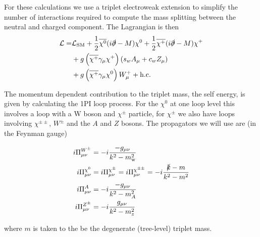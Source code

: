 \documentclass[11pt]{article}
\newcommand{\mychi}{\raisebox{0pt}[1ex][1ex]{$\chi$}}
\begin{document}
For these calculations we use a triplet electroweak extension to simplify the number of interactions required to compute the mass splitting between the neutral and charged component.  The Lagrangian is then
\begin{align}
\begin{split}
\mathcal{L}=&\mathcal{L}_{\text{SM}}+\frac{1}{2}\overline{\mychi^0}(i\slashed{\partial}-M)\mychi^0+\frac{1}{2}\overline{\mychi^+}(i\slashed{\partial}-M)\mychi^{+}\\
&+g\left(\overline{\mychi^+}\gamma_{\mu}\mychi^+\right)\left(s_wA_{\mu}+c_wZ_{\mu}\right)\\
&+g\left(\overline{\mychi^+}\gamma_{\mu}\mychi^0 \right)W_{\mu}^++\text{h.c.}
\end{split}
\end{align}

The momentum dependent contribution to the triplet mass, the self energy, is given by calculating the 1PI loop process.  For the $
\chi^0$ at one loop level this involves a loop with a W boson and $\chi^{\pm}$ particle, for $\chi^{\pm}$ we also have loops involving $
\chi^{\pm\pm}$, $W^{\pm}$ and the $A$ and $Z$ bosons.  The propagators we will use are (in the Feynman gauge)

\begin{align}
i\Pi^{W^{\pm}}_{\mu\nu}&=-i\frac{-g_{\mu\nu}}{k^2-m_{\text{w}}^2}\\
i\Pi^{\chi^{0}}_{\mu\nu}&=i\Pi^{\chi^{\pm}}_{\mu\nu}=i\Pi^{\chi^{\pm\pm}}_{\mu\nu}=-i\frac{\slashed{k}-m}{k^2-m^2}\\
i\Pi^{A}_{\mu\nu}&=-i\frac{-g_{\mu\nu}}{k^2-m_A^2}\\
i\Pi^{Z^{\pm}}_{\mu\nu}&=-i\frac{g_{\mu\nu}}{k^2-m_z^2}\\
\end{align}


where $m$ is taken to the be the degenerate (tree-level) triplet mass.
\end{document}

